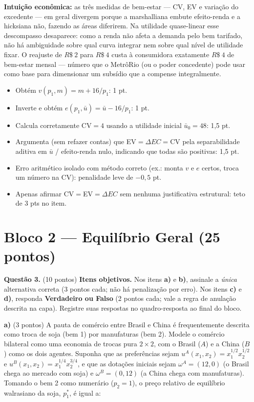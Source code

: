 \begin{solucao}
\textbf{Intuição econômica:} as três medidas de bem-estar — CV, EV e variação do excedente — em geral divergem porque a marshalliana embute efeito-renda e a hicksiana não, fazendo as áreas diferirem. Na utilidade quase-linear esse descompasso desaparece: como a renda não afeta a demanda pelo bem tarifado, não há ambiguidade sobre qual curva integrar nem sobre qual nível de utilidade fixar. O reajuste de $R\$~2$ para $R\$~4$ custa à consumidora exatamente $R\$~4$ de bem-estar mensal — número que o MetrôRio (ou o poder concedente) pode usar como base para dimensionar um subsídio que a compense integralmente.
\rubricalabel
\begin{itemize}
\item Obtém $v(p_1,m)=m+16/p_1$: 1 pt.
\item Inverte e obtém $e(p_1,\bar u)=\bar u-16/p_1$: 1 pt.
\item Calcula corretamente $\mathrm{CV}=4$ usando a utilidade inicial $\bar u_0=48$: 1{,}5 pt.
\item Argumenta (sem refazer contas) que EV$=\Delta EC=$CV pela separabilidade aditiva em $\bar u$ / efeito-renda nulo, indicando que todas são positivas: 1{,}5 pt.
\item Erro aritmético isolado com método correto (ex.: monta $v$ e $e$ certos, troca um número na CV): penalidade leve de $-0{,}5$ pt.
\item Apenas afirmar CV$=$EV$=\Delta EC$ sem nenhuma justificativa estrutural: teto de 3 pts no item.
\end{itemize}
\end{solucao}


\clearpage
\section*{Bloco 2 --- Equilíbrio Geral \hfill \normalsize (25 pontos)}

\textbf{Questão 3.} (10 pontos) \textbf{Itens objetivos.} Nos itens \textbf{a)} e \textbf{b)}, assinale a \emph{única} alternativa correta (3 pontos cada; não há penalização por erro). Nos itens \textbf{c)} e \textbf{d)}, responda \textbf{Verdadeiro ou Falso} (2 pontos cada; vale a regra de anulação descrita na capa). Registre suas respostas no quadro-resposta ao final do bloco.

\textbf{a)} (3 pontos) A pauta de comércio entre Brasil e China é frequentemente descrita como troca de soja (bem 1) por manufaturas (bem 2). Modele o comércio bilateral como uma economia de trocas pura $2\times 2$, com o Brasil ($A$) e a China ($B$) como os dois agentes. Suponha que as preferências sejam $u^A(x_1,x_2)=x_1^{1/2}x_2^{1/2}$ e $u^B(x_1,x_2)=x_1^{1/4}x_2^{3/4}$, e que as dotações iniciais sejam $\omega^A=(12,0)$ (o Brasil chega ao mercado com soja) e $\omega^B=(0,12)$ (a China chega com manufaturas). Tomando o bem 2 como numerário ($p_2=1$), o preço relativo de equilíbrio walrasiano da soja, $p_1^{*}$, é igual a:

